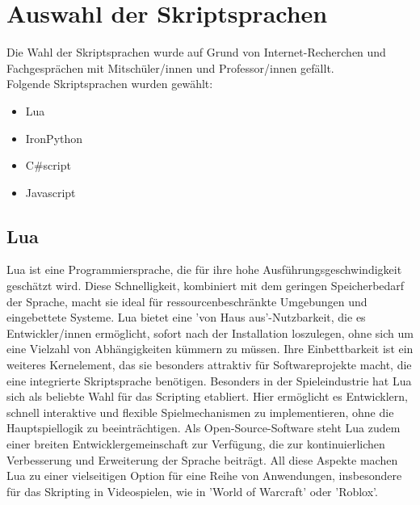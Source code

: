 \section{Auswahl der Skriptsprachen}

Die Wahl der Skriptsprachen wurde auf Grund von Internet-Recherchen 
und Fachgesprächen mit Mitschüler/innen und Professor/innen gefällt.\\
Folgende Skriptsprachen wurden gewählt:

\begin{itemize}
    \item Lua
    \item IronPython
    \item C\#script
    \item Javascript
\end{itemize}

\subsection{Lua}
Lua ist eine Programmiersprache, die für ihre hohe Ausführungsgeschwindigkeit geschätzt wird. 
Diese Schnelligkeit, kombiniert mit dem geringen Speicherbedarf der Sprache, macht sie ideal für ressourcenbeschränkte Umgebungen und eingebettete Systeme. 
Lua bietet eine 'von Haus aus'-Nutzbarkeit, die es Entwickler/innen ermöglicht, sofort nach der Installation loszulegen, ohne sich um eine Vielzahl von Abhängigkeiten kümmern zu müssen. 
Ihre Einbettbarkeit ist ein weiteres Kernelement, das sie besonders attraktiv für Softwareprojekte macht, die eine integrierte Skriptsprache benötigen. Besonders in der Spieleindustrie hat Lua sich als beliebte Wahl für das Scripting etabliert. Hier ermöglicht es Entwicklern, schnell interaktive und flexible Spielmechanismen zu implementieren, ohne die Hauptspiellogik zu beeinträchtigen. 
Als Open-Source-Software steht Lua zudem einer breiten Entwicklergemeinschaft zur Verfügung, die zur kontinuierlichen Verbesserung und Erweiterung der Sprache beiträgt.
All diese Aspekte machen Lua zu einer vielseitigen Option für eine Reihe von Anwendungen, insbesondere für das Skripting in Videospielen, wie in 'World of Warcraft' oder 'Roblox'.
\cite{gameScriptingMastery} \cite{luaDocs} \cite{programingInLua} \cite{nluaWebside} 

\newpage
